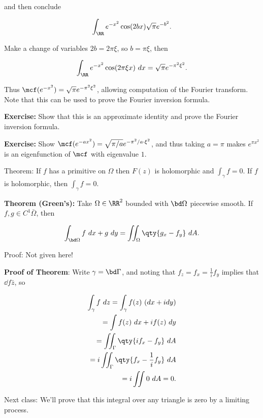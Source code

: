and then conclude

\begin{align*}
\int_\RR e^{-x^2} \cos(2bx) \sqrt{\pi} e^{-b^2}
.\end{align*}

Make a change of variables \(2b = 2\pi \xi\), so \(b = \pi \xi\), then

\begin{align*}
\int_\RR e^{-x^2} \cos(2\pi \xi x) ~dx = \sqrt{\pi} e^{-\pi^2 \xi^2}
.\end{align*}

Thus \(\mcf(e^{-x^2}) = \sqrt{\pi} e^{-\pi^2 \xi^2}\), allowing
computation of the Fourier transform. Note that this can be used to
prove the Fourier inversion formula.

\textbf{Exercise:} Show that this is an approximate identity and prove
the Fourier inversion formula.

\textbf{Exercise:} Show
\(\mcf(e^{-ax^2}) = \sqrt{\pi/a} e^{-\pi^2/a \cdot \xi^2}\), and thus
taking \(a = \pi\) makes \(e^{\pi x^2}\) is an eigenfunction of \(\mcf\)
with eigenvalue \(1\).

Theorem: If \(f\) has a primitive on \(\Omega\) then \(F(z)\) is
holomorphic and \(\int_\gamma f = 0\). If \(f\) is holomorphic, then
\(\int_\gamma f = 0\).

\textbf{Theorem (Green's):} Take \(\Omega \in \RR^2\) bounded with
\(\bd \Omega\) piecewise smooth. If \(f, g\in C^1{\bar \Omega}\), then

\begin{align*}
\int_{\bd \Omega} f ~dx + g ~dy = \iint_{\Omega} \qty{g_x - f_y} ~dA
.\end{align*}

Proof: Not given here!

\textbf{Proof of Theorem}: Write \(\gamma = \bd \Gamma\), and noting
that \(f_z = f_x = \frac 1 i f_y\) implies that \(\dd{f}{\bar z}\), so

\begin{align*}
\int_\gamma f ~dz = \int_\gamma f(z) ~(dx + i dy) \\
= \int f(z) ~dx + i f(z) ~dy \\
= \iint_\Gamma \qty{if_x - f_y} ~dA \\
= i \iint_\Gamma \qty{f_x - \frac 1 i f_y} ~dA \\
= i \iint 0 ~dA = 0
.\end{align*}

Next class: We'll prove that this integral over any triangle is zero by
a limiting process.

